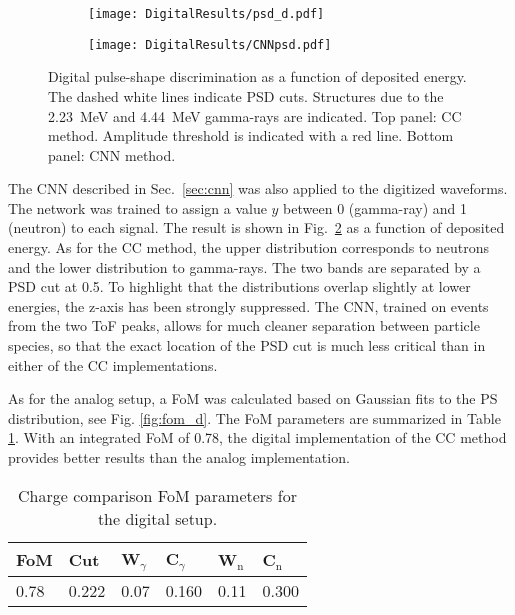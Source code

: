 \documentclass[main.tex]{subfiles}
\begin{document}
\begin{figure}
    \centering
    \begin{subfigure}[ht]{\textwidth}
    	\centering
        \texttt{[image: DigitalResults/psd\_d.pdf]}
        \caption{}
        \label{fig:psd_d}
    \end{subfigure}
	\begin{subfigure}[ht]{\textwidth}
		\centering
        \texttt{[image: DigitalResults/CNNpsd.pdf]}
        \caption{}
    	\label{fig:cnn_E} 
    \end{subfigure}
        \caption[Digital pulse-shape discrimination as a function of deposited energy.]{Digital pulse-shape discrimination as a function of deposited energy. The dashed white lines indicate PSD cuts. Structures due to the \SI{2.23}{MeV} and \SI{4.44}{MeV} gamma-rays are indicated. Top panel: CC method. Amplitude threshold is indicated with a red line. Bottom panel: CNN method.}
    \label{fig:ccm_cnn}
\end{figure}

The CNN described in Sec.~\ref{sec:cnn} was also applied to the digitized waveforms. The network was trained to assign a value $y$ between 0 (gamma-ray) and 1 (neutron) to each signal. The result is shown in Fig.~\ref{fig:cnn_E} as a function of deposited energy. As for the CC method, the upper distribution corresponds to neutrons and the lower distribution to gamma-rays. The two bands are separated by a PSD cut at 0.5. To highlight that the distributions overlap slightly at lower energies, the z-axis has been strongly suppressed. The CNN, trained on events from the two ToF peaks, allows for much cleaner separation between particle species, so that the exact location of the PSD cut is much less critical than in either of the CC implementations.

As for the analog setup, a FoM was calculated based on Gaussian fits to the PS distribution, see Fig. \ref{fig:fom_d}. The FoM parameters are summarized in Table \ref{tab:fom_d}. With an integrated FoM of 0.78, the digital implementation of the CC method provides better results than the analog implementation.

\begin{table}[h]
\center
\begin{tabular}{|l|l|l|l|l|l|}
\hline
FoM  & Cut   & W$_\gamma$ & C$_\gamma$ & W$_\textrm{n}$ & C$_\textrm{n}$ \\ \hline
0.78 & 0.222 & 0.07          & 0.160           & 0.11              & 0.300               \\ \hline
\end{tabular}
\caption{Charge comparison FoM parameters for the digital setup.}
\label{tab:fom_d}
\end{table}
\end{document}
